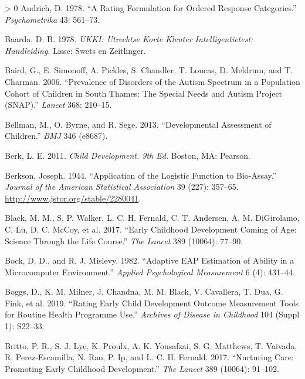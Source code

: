 \documentclass[
]{book}
\newlength{\cslhangindent}
\newenvironment{CSLReferences}[3] %
 {%
  \setlength{\parindent}{0pt}
  \ifodd #1 \everypar{\setlength{\hangindent}{\cslhangindent}}\ignorespaces\fi
  \ifnum #2 > 0
  \setlength{\parskip}{#2\baselineskip}
  \fi
 }%
 {}
\begin{document}
\hypertarget{refs}{}
\begin{CSLReferences}{1}{0}
\leavevmode\hypertarget{ref-andrich1978}{}%
Andrich, D. 1978. {``A Rating Formulation for Ordered Response Categories.''} \emph{Psychometrika} 43: 561--73.

\leavevmode\hypertarget{ref-baarda1978}{}%
Baarda, D. B. 1978. \emph{UKKI: Utrechtse Korte Kleuter Intelligentietest: Handleiding}. Lisse: Swets en Zeitlinger.

\leavevmode\hypertarget{ref-baird2006}{}%
Baird, G., E. Simonoff, A. Pickles, S. Chandler, T. Loucas, D. Meldrum, and T. Charman. 2006. {``Prevalence of Disorders of the Autism Spectrum in a Population Cohort of Children in South Thames: The Special Needs and Autism Project (SNAP).''} \emph{Lancet} 368: 210--15.

\leavevmode\hypertarget{ref-bellman2013}{}%
Bellman, M., O. Byrne, and R. Sege. 2013. {``Developmental Assessment of Children.''} \emph{BMJ} 346 (e8687).

\leavevmode\hypertarget{ref-berk2013}{}%
Berk, L. E. 2011. \emph{Child Development. 9th Ed.} Boston, MA: Pearson.

\leavevmode\hypertarget{ref-berkson1944}{}%
Berkson, Joseph. 1944. {``Application of the Logistic Function to Bio-Assay.''} \emph{Journal of the American Statistical Association} 39 (227): 357--65. \url{http://www.jstor.org/stable/2280041}.

\leavevmode\hypertarget{ref-black2017}{}%
Black, M. M., S. P. Walker, L. C. H. Fernald, C. T. Andersen, A. M. DiGirolamo, C. Lu, D. C. McCoy, et al. 2017. {``Early Childhood Development Coming of Age: Science Through the Life Course.''} \emph{The Lancet} 389 (10064): 77--90.

\leavevmode\hypertarget{ref-bock1982}{}%
Bock, D. D., and R. J. Mislevy. 1982. {``Adaptive {EAP} Estimation of Ability in a Microcomputer Environment.''} \emph{Applied Psychological Measurement} 6 (4): 431--44.

\leavevmode\hypertarget{ref-boggs2019}{}%
Boggs, D., K. M. Milner, J. Chandna, M. M. Black, V. Cavallera, T. Dua, G. Fink, et al. 2019. {``Rating Early Child Development Outcome Measurement Tools for Routine Health Programme Use.''} \emph{Archives of Disease in Childhood} 104 (Suppl 1): S22--33.

\leavevmode\hypertarget{ref-britto2017}{}%
Britto, P. R., S. J. Lye, K. Proulx, A. K. Yousafzai, S. G. Matthews, T. Vaivada, R. Perez-Escamilla, N. Rao, P. Ip, and L. C. H. Fernald. 2017. {``Nurturing Care: Promoting Early Childhood Development.''} \emph{The Lancet} 389 (10064): 91--102.


\end{CSLReferences}
\end{document}
